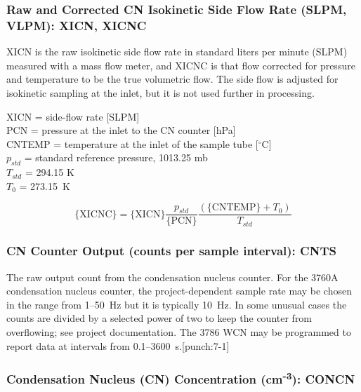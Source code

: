 \documentclass[
  english,
]{book}
\begin{document}
\hypertarget{xicnc}{%
\subsubsection*{Raw and Corrected CN Isokinetic Side Flow Rate (SLPM, VLPM): XICN, XICNC}\label{xicnc}}

XICN is the raw isokinetic side flow rate in standard liters per minute (SLPM) measured with a mass flow meter, and XICNC is that flow corrected for pressure and temperature to be the true volumetric flow. The side flow is adjusted for isokinetic sampling at the inlet, but it is not used further in processing.

XICN = side-flow rate {[}SLPM{]}\\
PCN = pressure at the inlet to the CN counter {[}hPa{]}\\
CNTEMP = temperature at the inlet of the sample tube {[}\(^{\circ}\)C{]}\\
\(p_{std}\) = standard reference pressure, 1013.25 mb\\
\(T_{std}\)
= 294.15 K\\
\(T_{0}\) = 273.15~K

\begin{equation}
\mathrm{\{XICNC\} = \{XICN\}}\frac{p_{std}}{\mathrm{\{PCN\}}}\frac{(\{\mathrm{CNTEMP\}}+T_{0})}{T_{std}}
\label{eq:XICNCbox}
\end{equation}

\hypertarget{cnts}{%
\subsubsection*{CN Counter Output (counts per sample interval): CNTS}\label{cnts}}

The raw output count from the condensation nucleus counter. For the 3760A condensation nucleus counter, the project-dependent sample rate may be chosen in the range from 1--50~Hz but it is typically 10~Hz. In some unusual cases the counts are divided by a selected power of two to keep the counter from overflowing; see project documentation. The 3786 WCN may be programmed to report data at intervals from 0.1--3600~s.\protect\hypertarget{punch:7-1}{}{{[}punch:7-1{]}}

\hypertarget{concn}{%
\subsubsection*{\texorpdfstring{Condensation Nucleus (CN) Concentration (cm\textsuperscript{-3}): CONCN}{Condensation Nucleus (CN) Concentration (cm-3): CONCN}}\label{concn}}
\end{document}
